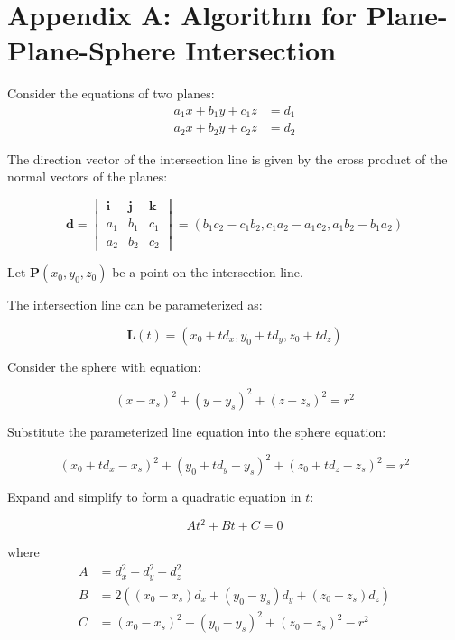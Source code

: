 \documentclass[12pt]{article}
\begin{document}
	\section{Appendix A: Algorithm for Plane-Plane-Sphere Intersection \cite{OpenAI2023}}
	
	Consider the equations of two planes:
	\begin{align}
		a_1 x + b_1 y + c_1 z &= d_1 \label{eq:plane1} \\
		a_2 x + b_2 y + c_2 z &= d_2 \label{eq:plane2}
	\end{align}
	
	The direction vector of the intersection line is given by the cross product of the normal vectors of the planes:
	
	
	\[
	\mathbf{d} = \begin{vmatrix}
		\mathbf{i} & \mathbf{j} & \mathbf{k} \\
		a_1 & b_1 & c_1 \\
		a_2 & b_2 & c_2
	\end{vmatrix} = (b_1 c_2 - c_1 b_2, c_1 a_2 - a_1 c_2, a_1 b_2 - b_1 a_2)
	\]
	
	
	
	Let \( \mathbf{P}(x_0, y_0, z_0) \) be a point on the intersection line.
	
	The intersection line can be parameterized as:
	
	
	\[
	\mathbf{L}(t) = (x_0 + t d_x, y_0 + t d_y, z_0 + t d_z)
	\]
	
	
	
	Consider the sphere with equation:
	
	
	\[
	(x - x_s)^2 + (y - y_s)^2 + (z - z_s)^2 = r^2
	\]
	
	
	
	Substitute the parameterized line equation into the sphere equation:
	
	
	\[
	(x_0 + t d_x - x_s)^2 + (y_0 + t d_y - y_s)^2 + (z_0 + t d_z - z_s)^2 = r^2
	\]
	
	
	
	Expand and simplify to form a quadratic equation in \( t \):
	
	
	\[
	A t^2 + B t + C = 0
	\]
	
	
	where
	\begin{align*}
		A &= d_x^2 + d_y^2 + d_z^2 \\
		B &= 2 \left( (x_0 - x_s) d_x + (y_0 - y_s) d_y + (z_0 - z_s) d_z \right) \\
		C &= (x_0 - x_s)^2 + (y_0 - y_s)^2 + (z_0 - z_s)^2 - r^2
	\end{align*}
	
\end{document}

